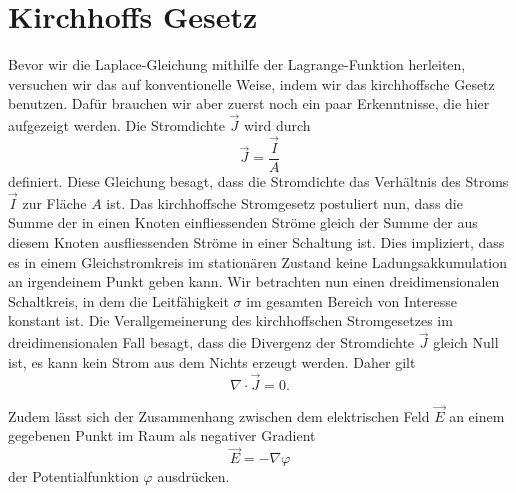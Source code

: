 %
%
%
%
\section{Kirchhoffs Gesetz
\label{circuit:section:teil1}}
Bevor wir die Laplace-Gleichung mithilfe der Lagrange-Funktion herleiten, versuchen wir das auf konventionelle Weise, indem wir  das kirchhoffsche Gesetz benutzen. 
Dafür brauchen wir aber zuerst noch ein paar Erkenntnisse, die hier aufgezeigt werden.
Die Stromdichte $\vec{J}$ wird durch
%
\begin{equation}
	\vec{J}=\frac{\vec{I}}{A}
	\label{circuit:current_density_3}
\end{equation}
definiert. Diese Gleichung besagt, dass die Stromdichte das Verhältnis des Stroms $\vec{I}$ zur Fläche $A$ ist. 
Das kirchhoffsche Stromgesetz postuliert nun, dass die Summe der
%
%
in einen Knoten einfliessenden Ströme gleich der Summe der aus
diesem Knoten ausfliessenden Ströme in einer Schaltung ist.
Dies impliziert, dass es in einem Gleichstromkreis im stationären Zustand
keine Ladungsakkumulation an irgendeinem Punkt geben kann.
Wir betrachten nun einen dreidimensionalen Schaltkreis, in dem die
Leitfähigkeit $\sigma$ im gesamten Bereich von Interesse konstant
ist.
Die Verallgemeinerung des kirchhoffschen Stromgesetzes im
dreidimensionalen Fall besagt, dass die Divergenz der Stromdichte
$\vec{J}$ gleich Null ist, es kann kein Strom aus dem Nichts erzeugt
werden. Daher gilt
\begin{equation}
	\nabla \cdot  \vec{J}=0.
	\label{circuit:current_density_1}
\end{equation}

Zudem lässt sich der Zusammenhang zwischen dem elektrischen Feld $\vec{E}$ an einem gegebenen Punkt im Raum als negativer Gradient 
\begin{equation}
	\vec{E}=-\nabla \varphi
	\label{circuit:current_density_4}
\end{equation}
der Potentialfunktion $\varphi$ ausdrücken.

